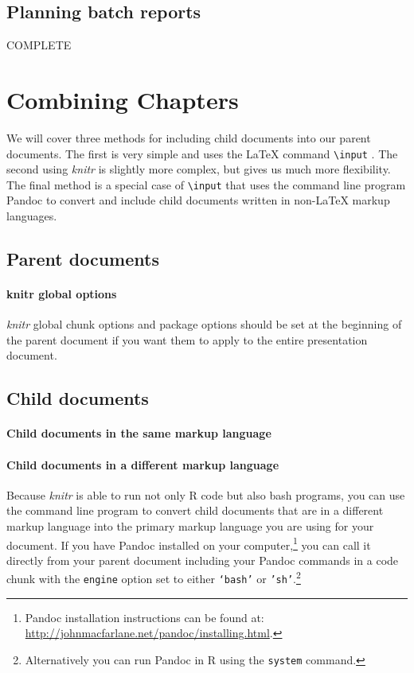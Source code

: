 \subsection{Planning batch reports}

COMPLETE

\section{Combining Chapters}

We will cover three methods for including child documents into our parent documents. The first is very simple and uses the LaTeX command \texttt{\textbackslash{}input} . The second using {\emph{knitr}} is slightly more complex, but gives us much more flexibility. The final method is a special case of \texttt{\textbackslash{}input} that uses the command line program Pandoc  to convert and include child documents written in non-LaTeX markup languages. 

\subsection{Parent documents}

\paragraph{knitr global options}
{\emph{knitr}} global chunk options and package options should be set at the beginning of the parent document if you want them to apply to the entire presentation document. 

\subsection{Child documents}

\paragraph{Child documents in the same markup language}

\paragraph{Child documents in a different markup language}

Because {\emph{knitr}} is able to run not only R code but also bash programs, you can use the  command line program to convert child documents that are in a different markup language into the primary markup language you are using for your document. If you have Pandoc installed on your computer,\footnote{Pandoc installation instructions can be found at: \url{http://johnmacfarlane.net/pandoc/installing.html}.} you can call it directly from your parent document including your Pandoc commands in a code chunk with the \texttt{engine} option set to either \texttt{`bash'} or \texttt{'sh'}.\footnote{Alternatively you can run Pandoc in R using the {\tt{system}} command.} 

